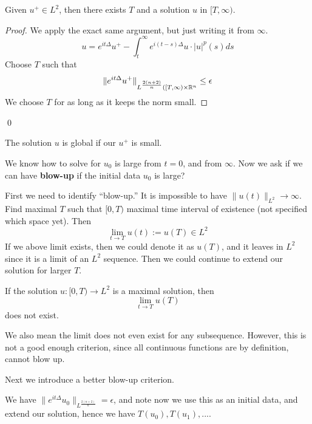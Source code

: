 \begin{theorem}
    Given $u^+\in L^2$, then there exists $T$ and a solution $u$ in $[T,\infty)$.
\end{theorem}
\begin{proof}
    We apply the exact same argument, but just writing it from $\infty$.
    \begin{equation*}
        u=e^{it\Delta}u^+-\int_t^\infty e^{i(t-s)\Delta}u\cdot|u|^p(s)ds
    \end{equation*}
    Choose $T$ such that 
    \begin{equation*}
        \|e^{it\Delta}u^+\|_{L^\frac{2(n+2)}{n}([T,\infty)\times\mathbb{R}^n}\leq\epsilon
    \end{equation*}
    We choose $T$ for as long as it keeps the norm small.
\end{proof}
\qed

\begin{note}
    The solution $u$ is global if our $u^+$ is small.
\end{note}
We know how to solve for $u_0$ is large from $t=0$, and from $\infty$. Now we ask if we can have \textbf{blow-up} if the initial data $u_0$ is large?

First we need to identify ``blow-up.'' It is impossible to have $\|u(t)\|_{L^2}\to\infty$. Find maximal $T$ such that $[0,T)$ maximal time interval of existence (not specified which space yet). Then
\begin{equation*}
    \lim_{t\to T}u(t):=u(T) \in L^2
\end{equation*}
If we above limit exists, then we could denote it as $u(T)$, and it leaves in $L^2$ since it is a limit of an $L^2$ sequence. Then we could continue to extend our solution for larger $T$.

\begin{proposition}
    If the solution $u: [0,T)\to L^2$ is a maximal solution, then
    \begin{equation*}
        \lim_{t\to T}u(T)
    \end{equation*}
    does not exist.
\end{proposition}
\begin{note}
    We also mean the limit does not even exist for any subsequence. However, this is not a good enough criterion, since all continuous functions are by definition, cannot blow up.
\end{note}

Next we introduce a better blow-up criterion. 

We have $\|e^{it\Delta}u_0\|_{L^\frac{2(n+2)}{n}}=\epsilon$, and note now we use this as an initial data, and extend our solution, hence we have $T(u_0), T(u_1), ...$.

